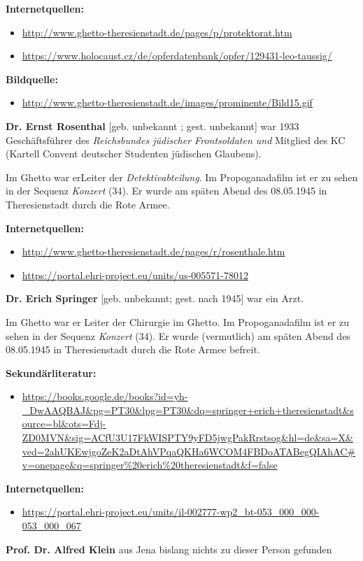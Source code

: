 \documentclass[a4paper]{article}
\begin{document}
\bigskip


\bigskip

\textbf{Internetquellen:}

\begin{itemize}
\item \url{http://www.ghetto-theresienstadt.de/pages/p/protektorat.htm} 
\item \url{https://www.holocaust.cz/de/opferdatenbank/opfer/129431-leo-taussig/} 
\end{itemize}

\bigskip

\textbf{Bildquelle:}

\begin{itemize}
\item \url{http://www.ghetto-theresienstadt.de/images/prominente/Bild15.gif} 
\end{itemize}
\textbf{Dr. Ernst Rosenthal} [geb. unbekannt ; gest. unbekannt] war 1933 Geschäftsführer des \textit{Reichsbundes
jüdischer Frontsoldaten und }Mitglied des KC (Kartell Convent deutscher Studenten jüdischen Glaubens).

Im Ghetto war erLeiter der \textit{Detektivabteilung}. Im Propoganadafilm ist er zu sehen in der Sequenz
\textit{Konzert} (34). Er wurde am späten Abend des 08.05.1945 in Theresienstadt durch die Rote Armee.


\bigskip


\bigskip

\textbf{Internetquellen:}

\begin{itemize}
\item \url{http://www.ghetto-theresienstadt.de/pages/r/rosenthale.htm} 
\item \url{https://portal.ehri-project.eu/units/us-005571-78012} 
\end{itemize}

\bigskip

\textbf{Dr. Erich Springer} [geb. unbekannt; gest. nach 1945] war ein Arzt.

Im Ghetto war er Leiter der Chirurgie im Ghetto. Im Propoganadafilm ist er zu sehen in der Sequenz \textit{Konzert}
(34). Er wurde (vermutlich) am späten Abend des 08.05.1945 in Theresienstadt durch die Rote Armee befreit.


\bigskip


\bigskip

\textbf{Sekundärliteratur:}

\begin{itemize}
\item
\url{https://books.google.de/books?id=yh-_DwAAQBAJ&pg=PT30&lpg=PT30&dq=springer+erich+theresienstadt&source=bl&ots=Fdj-ZD0MVN&sig=ACfU3U17FkWISPTY9yFD5jwgPakRrstsog&hl=de&sa=X&ved=2ahUKEwjgoZeK2aDtAhVPqaQKHa6WCOM4FBDoATABegQIAhAC#v=onepage&q=springer%20erich%20theresienstadt&f=false} 
\end{itemize}

\bigskip


\bigskip

\textbf{Internetquellen:}

\begin{itemize}
\item \url{https://portal.ehri-project.eu/units/il-002777-wp2_bt-053_000_000-053_000_067} 
\end{itemize}
\textbf{Prof. Dr. Alfred Klein} aus Jena bislang nichts zu dieser Person gefunden


\bigskip


\bigskip
\end{document}
